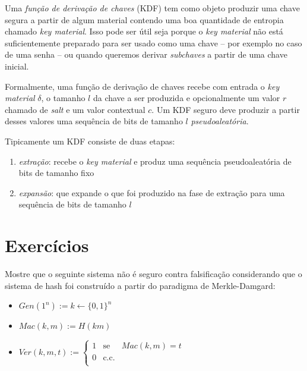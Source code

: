 Uma {\em função de derivação de chaves} (KDF) tem como objeto produzir uma chave segura a partir de algum material contendo uma boa quantidade de entropia chamado {\em key material}.
Isso pode ser útil seja porque o {\em key material} não está suficientemente preparado para ser usado como uma chave -- por exemplo no caso de uma senha -- ou quando queremos derivar {\em subchaves} a partir de uma chave inicial.

Formalmente, uma função de derivação de chaves recebe com entrada o {\em key material} $\delta$, o tamanho $l$ da chave a ser produzida e opcionalmente um valor $r$ chamado de {\em salt} e um valor contextual $c$.
Um KDF seguro deve produzir a partir desses valores uma sequência de bits de tamanho $l$ {\em pseudoaleatória}.

Tipicamente um KDF consiste de duas etapas: 
\begin{enumerate}
\item {\em extração}: recebe o {\em key material} e produz uma sequência pseudoaleatória de bits de tamanho fixo
\item {\em expansão}: que expande o que foi produzido na fase de extração para uma sequência de bits de tamanho $l$
\end{enumerate}



\section{Exercícios}
\label{sec:exercicios}


\begin{exercicio}
  Mostre que o seguinte sistema não é seguro contra falsificação considerando que o sistema de hash foi construído a partir do paradigma de Merkle-Damgard:
\begin{itemize}
\item $Gen(1^n) := k \leftarrow \{0,1\}^n$
\item $Mac(k,m) := H(km)$
\item $Ver(k,m,t) := \left\{
    \begin{array}{lcl}
      1 & \textrm{se} & Mac(k,m) = t\\
      0 & \textrm{c.c.} &\\
    \end{array}
    \right.$ 
\end{itemize}

\end{exercicio}


